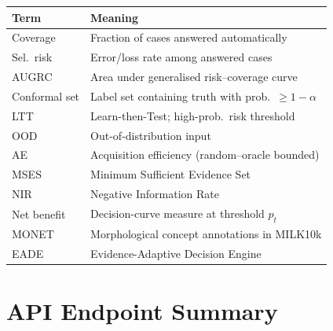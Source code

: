 \documentclass[conference]{IEEEtran}
\newcommand{\1}{\mathbf{1}}
\begin{document}
\begin{table}[H]
  \centering
  \renewcommand{\arraystretch}{1.2}
  \small
  \begin{tabular}{p{1.3cm}p{5.9cm}}
    \toprule
    \textbf{Term} & \textbf{Meaning} \\
    \midrule
    Coverage & Fraction of cases answered automatically \\
    Sel.\ risk & Error/loss rate among answered cases \\
    AUGRC & Area under generalised risk--coverage curve \\
    Conformal set & Label set containing truth with prob.\ $\geq 1-\alpha$ \\
    LTT & Learn-then-Test; high-prob.\ risk threshold \\
    OOD & Out-of-distribution input \\
    AE & Acquisition efficiency (random--oracle bounded) \\
    MSES & Minimum Sufficient Evidence Set \\
    NIR & Negative Information Rate \\
    Net benefit & Decision-curve measure at threshold $p_t$ \\
    MONET & Morphological concept annotations in MILK10k \\
    EADE & Evidence-Adaptive Decision Engine \\
    \bottomrule
  \end{tabular}
\end{table}

\section{API Endpoint Summary}
\label{app:api}
\end{document}
